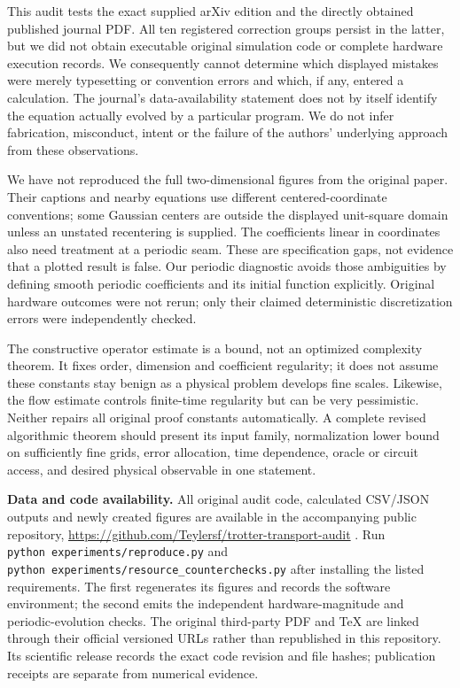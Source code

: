 This audit tests the exact supplied arXiv edition and the directly
obtained published journal PDF. All ten registered correction groups
persist in the latter, but we did not obtain executable original
simulation code or complete hardware execution records. We consequently
cannot determine which displayed mistakes were merely typesetting or
convention errors and which, if any, entered a calculation. The
journal's data-availability statement does not by itself identify the
equation actually evolved by a particular program. We do not infer
fabrication, misconduct, intent or the failure of the authors'
underlying approach from these observations.

We have not reproduced the full two-dimensional figures from the
original paper. Their captions and nearby equations use different
centered-coordinate conventions; some Gaussian centers are outside the
displayed unit-square domain unless an unstated recentering is supplied.
The coefficients linear in coordinates also need treatment at a periodic
seam. These are specification gaps, not evidence that a plotted result
is false. Our periodic diagnostic avoids those ambiguities by defining
smooth periodic coefficients and its initial function explicitly.
Original hardware outcomes were not rerun; only their claimed
deterministic discretization errors were independently checked.

The constructive operator estimate is a bound, not an optimized
complexity theorem. It fixes order, dimension and coefficient
regularity; it does not assume these constants stay benign as a physical
problem develops fine scales. Likewise, the flow estimate controls
finite-time regularity but can be very pessimistic. Neither repairs all
original proof constants automatically. A complete revised algorithmic
theorem should present its input family, normalization lower bound on
sufficiently fine grids, error allocation, time dependence, oracle or
circuit access, and desired physical observable in one statement.

\textbf{Data and code availability.} All original audit code, calculated
CSV/JSON outputs and newly created figures are available in the
accompanying public repository,
\url{https://github.com/Teylersf/trotter-transport-audit} . Run
\texttt{python\ experiments/reproduce.py} and
\texttt{python\ experiments/resource\_counterchecks.py} after installing
the listed requirements. The first regenerates its figures and records
the software environment; the second emits the independent
hardware-magnitude and periodic-evolution checks. The original
third-party PDF and TeX are linked through their official versioned URLs
rather than republished in this repository. Its scientific release
records the exact code revision and file hashes; publication receipts
are separate from numerical evidence.

